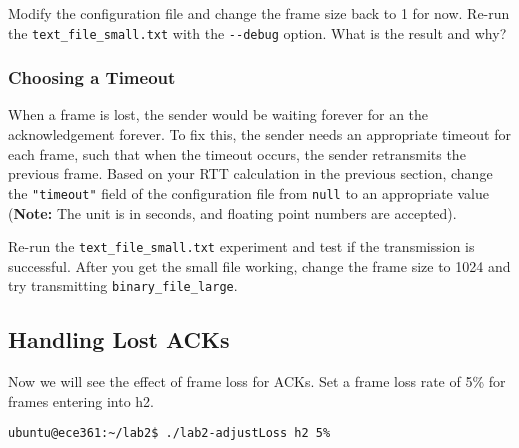 \documentclass[11pt]{article}
\begin{document}
Modify the configuration file and change the frame size back to 1 for now.
Re-run the \texttt{text\_file\_small.txt} with the \texttt{-{}-debug} option. What is the result and why?

\subsubsection {Choosing a Timeout}
When a frame is lost, the sender would be waiting forever for an the acknowledgement forever.
To fix this, the sender needs an appropriate timeout for each frame, such that when the timeout occurs, the sender retransmits the previous frame.
Based on your RTT calculation in the previous section, change the \texttt{"timeout"} field of the configuration file from \texttt{null} to an appropriate value (\textbf{Note:} The unit is in seconds, and floating point numbers are accepted).


Re-run the \texttt{text\_file\_small.txt} experiment and test if the transmission is successful.
After you get the small file working, change the frame size to 1024 and try transmitting \texttt{binary\_file\_large}.


\subsection {Handling Lost ACKs}
Now we will see the effect of frame loss for ACKs. Set a frame loss rate of 5\% for frames entering into h2.
\begin{lstlisting}[style=ece361-shell-base, caption={}]
ubuntu@ece361:~/lab2$ ./lab2-adjustLoss h2 5%
\end{lstlisting}
\end{document}
